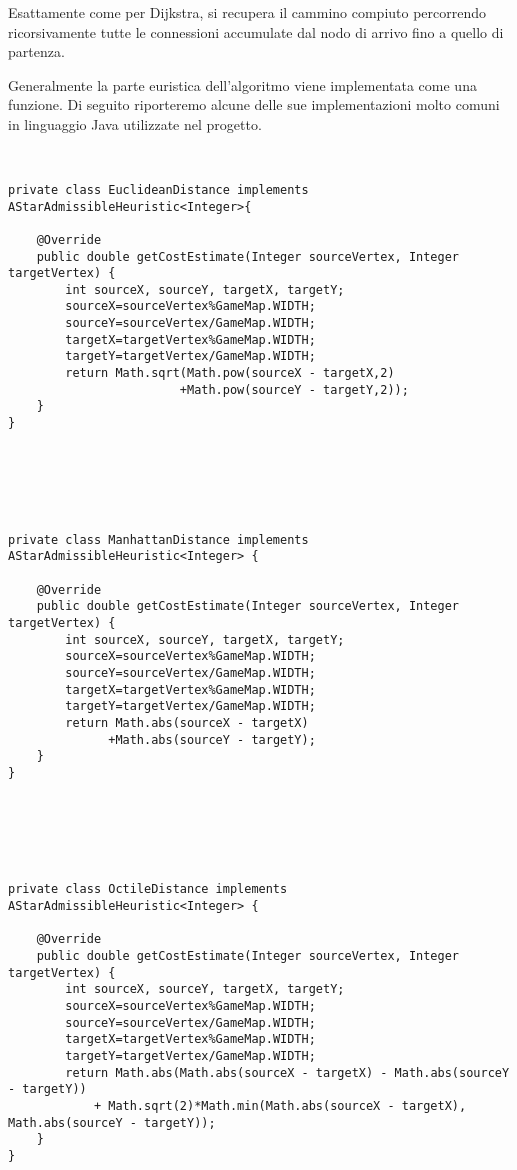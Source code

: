 \documentclass[11pt]{article}
\begin{document}
\par{Esattamente come per Dijkstra, si recupera il cammino compiuto percorrendo ricorsivamente tutte le connessioni accumulate dal nodo di arrivo fino a quello di partenza.}
\par{Generalmente la parte euristica dell'algoritmo viene implementata come una funzione.
Di seguito riporteremo alcune delle sue implementazioni molto comuni in linguaggio Java utilizzate nel progetto.
\lstset{style=customjava, caption=Alcune funzioni euristiche}
\begin{lstlisting}


private class EuclideanDistance implements AStarAdmissibleHeuristic<Integer>{

    @Override
    public double getCostEstimate(Integer sourceVertex, Integer targetVertex) {
        int sourceX, sourceY, targetX, targetY;
        sourceX=sourceVertex%GameMap.WIDTH;
        sourceY=sourceVertex/GameMap.WIDTH;
        targetX=targetVertex%GameMap.WIDTH;
        targetY=targetVertex/GameMap.WIDTH;
        return Math.sqrt(Math.pow(sourceX - targetX,2)
                        +Math.pow(sourceY - targetY,2));
    }
}






private class ManhattanDistance implements AStarAdmissibleHeuristic<Integer> {

    @Override
    public double getCostEstimate(Integer sourceVertex, Integer targetVertex) {
        int sourceX, sourceY, targetX, targetY;
        sourceX=sourceVertex%GameMap.WIDTH;
        sourceY=sourceVertex/GameMap.WIDTH;
        targetX=targetVertex%GameMap.WIDTH;
        targetY=targetVertex/GameMap.WIDTH;
        return Math.abs(sourceX - targetX)
              +Math.abs(sourceY - targetY);
    }
}






private class OctileDistance implements AStarAdmissibleHeuristic<Integer> {

    @Override
    public double getCostEstimate(Integer sourceVertex, Integer targetVertex) {
        int sourceX, sourceY, targetX, targetY;
        sourceX=sourceVertex%GameMap.WIDTH;
        sourceY=sourceVertex/GameMap.WIDTH;
        targetX=targetVertex%GameMap.WIDTH;
        targetY=targetVertex/GameMap.WIDTH;
        return Math.abs(Math.abs(sourceX - targetX) - Math.abs(sourceY - targetY))
            + Math.sqrt(2)*Math.min(Math.abs(sourceX - targetX), Math.abs(sourceY - targetY));
    }
}
\end{lstlisting}
}
\end{document}
